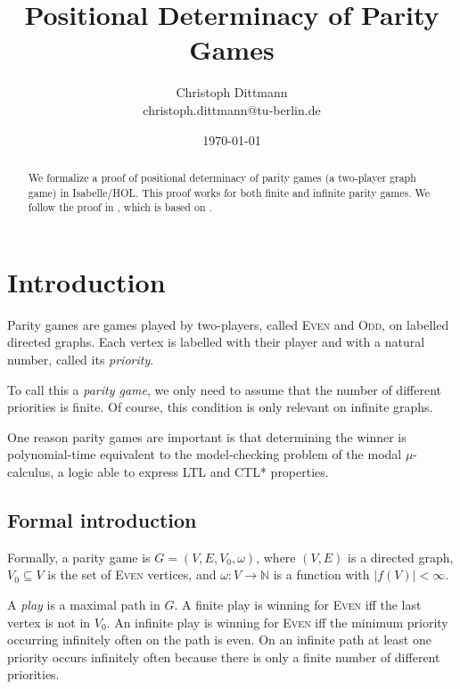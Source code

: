 \documentclass[11pt,a4paper]{scrartcl}
\newcommand{\Even}{\textsc{Even}\xspace}
\newcommand{\Odd}{\textsc{Odd}\xspace}
\begin{document}
\title{Positional Determinacy of Parity Games}
\author{Christoph Dittmann\\christoph.dittmann@tu-berlin.de}
\date{\today}
\maketitle

\begin{abstract}
  We formalize a proof of positional determinacy of parity games (a
  two-player graph game) in Isabelle/HOL.  This proof works for both
  finite and infinite parity games.  We follow the proof in
  \cite{kreutzer2015}, which is based on \cite{zielonka1998}.
\end{abstract}

\tableofcontents
\newpage

\section{Introduction}

Parity games are games played by two-players, called \Even and \Odd,
on labelled directed graphs.  Each vertex is labelled with their
player and with a natural number, called its \emph{priority}.

To call this a \emph{parity game}, we only need to assume that the
number of different priorities is finite.  Of course, this condition
is only relevant on infinite graphs.

One reason parity games are important is that determining the winner
is polynomial-time equivalent to the model-checking problem of the
modal $\mu$-calculus, a logic able to express LTL and CTL* properties.

\subsection{Formal introduction}

Formally, a parity game is $G = (V,E,V_0,\omega)$, where $(V,E)$ is a
directed graph, $V_0 \subseteq V$ is the set of \Even vertices, and
$\omega: V \to \mathbb{N}$ is a function with $|f(V)| < \infty$.

A \emph{play} is a maximal path in $G$.  A finite play is winning for
\Even iff the last vertex is not in $V_0$.  An infinite play is
winning for \Even iff the minimum priority occurring infinitely often
on the path is even.  On an infinite path at least one priority occurs
infinitely often because there is only a finite number of different
priorities.
\end{document}
